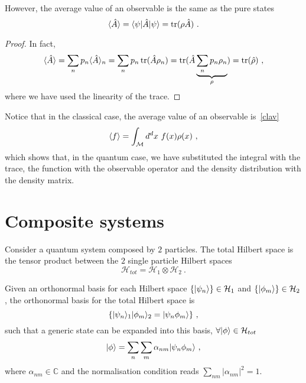     However, the average value of an observable is the same as the pure states 
    \begin{equation*}
        \langle\hat A\rangle = \langle\psi\vert \hat A \vert\psi\rangle = \operatorname{tr} (\rho \hat A) ~.
    \end{equation*}
    \begin{proof}
        In fact, 
        \begin{equation*}
            \langle\hat A\rangle = \sum_n p_n \langle\hat A\rangle_n = \sum_n p_n \operatorname{tr}(\hat A \rho_n) = \operatorname{tr} (\hat A \underbrace{\sum_n p_n \rho_n}_\rho) = \operatorname{tr} (\hat \rho) ~,
        \end{equation*}
        where we have used the linearity of the trace.
    \end{proof}

    Notice that in the classical case, the average value of an observable is~\eqref{clav}
    \begin{equation*}
        \langle f\rangle = \int_{\mathcal M} d^d x ~ f(x) \rho(x) ~,
    \end{equation*}
    which shows that, in the quantum case, we have substituted the integral with the trace, the function with the observable operator and the density distribution with the density matrix.

\section{Composite systems}

    Consider a quantum system composed by $2$ particles. The total Hilbert space is the tensor product between the $2$ single particle Hilbert spaces 
    \begin{equation*}
        \mathcal H_{tot} = \mathcal H_1 \otimes \mathcal H_2 ~. 
    \end{equation*}

    Given an orthonormal basis for each Hilbert space $\{\vert\psi_n\rangle\} \in \mathcal H_1$ and $\{\vert\phi_m\rangle\} \in \mathcal H_2$, the orthonormal basis for the total Hilbert space is 
    \begin{equation*}
        \{\vert\psi_n\rangle_1 \vert\phi_m\rangle_2 = \vert\psi_n \phi_m\rangle\} ~,
    \end{equation*}
    such that a generic state can be expanded into this basis, $\forall \vert\phi\rangle \in \mathcal H_{tot}$
    \begin{equation*}
        \vert\phi\rangle = \sum_n \sum_m \alpha_{nm} \vert\psi_n \phi_m\rangle ~,
    \end{equation*}
    where $\alpha_{nm} \in \mathbb C$ and the normalisation condition reads $\sum_{nm} |\alpha_{nm}|^2 = 1$. 

